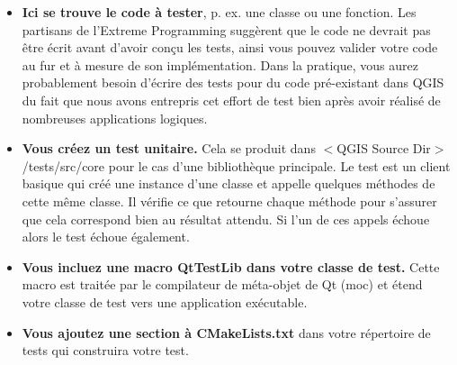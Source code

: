 \begin{itemize}
\item \textbf{Ici se trouve le code \`a tester}, p. ex. une classe ou une fonction. Les partisans de l'Extreme Programming sugg\`erent que le code ne devrait pas \^etre \'ecrit avant d'avoir con\c{c}u les tests, ainsi vous pouvez valider votre code au fur et  \`a mesure de son impl\'ementation. Dans la pratique, vous aurez probablement besoin d'\'ecrire des tests pour du code pr\'e-existant dans QGIS du fait que nous avons entrepris cet effort de test bien apr\`es avoir r\'ealis\'e de nombreuses applications logiques.

\item \textbf{Vous cr\'eez un test unitaire.} Cela se produit dans $<$QGIS Source Dir$>$/tests/src/core pour le cas d'une biblioth\`eque principale. Le test est un client basique qui cr\'e\'e une instance d'une classe et appelle quelques m\'ethodes de cette m\^eme classe. Il v\'erifie ce que retourne chaque m\'ethode pour s'assurer que cela correspond bien au r\'esultat attendu. Si l'un de ces appels \'echoue alors le test \'echoue \'egalement.

\item \textbf{Vous incluez une macro QtTestLib dans votre classe de test.} Cette macro est trait\'ee par le compilateur de m\'eta-objet de Qt (moc) et \'etend votre classe de test vers une application ex\'ecutable.

% 
% 
% 
% 
\item \textbf{Vous ajoutez une section \`a CMakeLists.txt} dans votre r\'epertoire de tests qui construira votre test.


\end{itemize}
